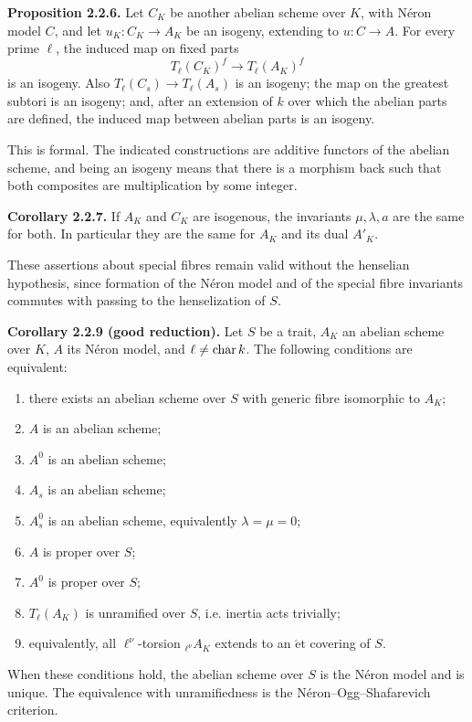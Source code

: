 \documentclass[11pt]{article}
\providecommand{\etale}{\mathrm{\acute et}}
\begin{document}
\textbf{Proposition 2.2.6.}  Let \(C_K\) be another abelian scheme over \(K\), with N\'eron model \(C\), and let \(u_K:C_K\to A_K\) be an isogeny, extending to \(u:C\to A\).  For every prime \(\ell\), the induced map on fixed parts
\begin{equation}\tag{2.2.6.0}
 T_\ell(C_K)^f\longrightarrow T_\ell(A_K)^f
\end{equation}
is an isogeny.  Also \(T_\ell(C_s)\to T_\ell(A_s)\) is an isogeny; the map on the greatest subtori is an isogeny; and, after an extension of \(k\) over which the abelian parts are defined, the induced map between abelian parts is an isogeny.

This is formal.  The indicated constructions are additive functors of the abelian scheme, and being an isogeny means that there is a morphism back such that both composites are multiplication by some integer.

\textbf{Corollary 2.2.7.}  If \(A_K\) and \(C_K\) are isogenous, the invariants \(\mu,\lambda,a\) are the same for both.  In particular they are the same for \(A_K\) and its dual \(A'_K\).

These assertions about special fibres remain valid without the henselian hypothesis, since formation of the N\'eron model and of the special fibre invariants commutes with passing to the henselization of \(S\).

\textbf{Corollary 2.2.9 (good reduction).}  Let \(S\) be a trait, \(A_K\) an abelian scheme over \(K\), \(A\) its N\'eron model, and \(\ell\ne\operatorname{char} k\).  The following conditions are equivalent:
\begin{enumerate}[label=(\roman*)]
\item there exists an abelian scheme over \(S\) with generic fibre isomorphic to \(A_K\);
\item \(A\) is an abelian scheme;
\item \(A^0\) is an abelian scheme;
\item \(A_s\) is an abelian scheme;
\item \(A_s^0\) is an abelian scheme, equivalently \(\lambda=\mu=0\);
\item \(A\) is proper over \(S\);
\item \(A^0\) is proper over \(S\);
\item \(T_\ell(A_K)\) is unramified over \(S\), i.e. inertia acts trivially;
\item equivalently, all \(\ell^\nu\)-torsion \({}_{\ell^\nu}A_K\) extends to an \(\etale\) covering of \(S\).
\end{enumerate}
When these conditions hold, the abelian scheme over \(S\) is the N\'eron model and is unique.  The equivalence with unramifiedness is the N\'eron--Ogg--Shafarevich criterion.
\end{document}
